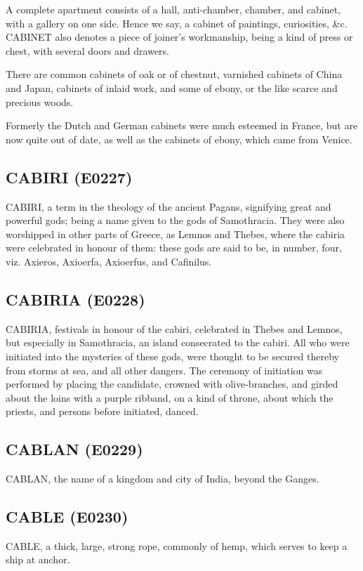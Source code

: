 \documentclass{article}
\begin{document}
A complete apartment consists of a hall, anti-chamber, chamber, and cabinet, with a gallery on one side. Hence we say, a cabinet of paintings, curiosities, \&c. CABINET also denotes a piece of joiner's workmanship, being a kind of press or chest, with several doors and drawers.

There are common cabinets of oak or of chestnut, varnished cabinets of China and Japan, cabinets of inlaid work, and some of ebony, or the like scarce and precious woods.

Formerly the Dutch and German cabinets were much esteemed in France, but are now quite out of date, as well as the cabinets of ebony, which came from Venice.

\subsection*{CABIRI (E0227)}
CABIRI, a term in the theology of the ancient Pagans, signifying great and powerful gods; being a name given to the gods of Samothracia. They were also worshipped in other parts of Greece, as Lemnos and Thebes, where the cabiria were celebrated in honour of them: these gods are said to be, in number, four, viz. Axieros, Axioerfa, Axioerfus, and Cafinilus.

\subsection*{CABIRIA (E0228)}
CABIRIA, festivals in honour of the cabiri, celebrated in Thebes and Lemnos, but especially in Samothracia, an island consecrated to the cabiri. All who were initiated into the mysteries of these gods, were thought to be secured thereby from storms at sea, and all other dangers. The ceremony of initiation was performed by placing the candidate, crowned with olive-branches, and girded about the loins with a purple ribband, on a kind of throne, about which the priests, and persons before initiated, danced.

\subsection*{CABLAN (E0229)}
CABLAN, the name of a kingdom and city of India, beyond the Ganges.

\subsection*{CABLE (E0230)}
CABLE, a thick, large, strong rope, commonly of hemp, which serves to keep a ship at anchor.
\end{document}
